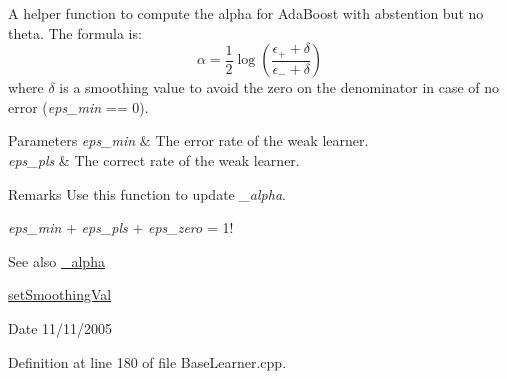 A helper function to compute the alpha for AdaBoost with abstention but no theta. The formula is: \[ \alpha = \frac{1}{2} \log \left( \frac{\epsilon_+ + \delta}{\epsilon_- + \delta} \right) \] where $\delta$ is a smoothing value to avoid the zero on the denominator in case of no error ({\itshape eps\_\-min\/} == 0). 
\begin{DoxyParams}{Parameters}
{\em eps\_\-min} & The error rate of the weak learner. \\
\hline
{\em eps\_\-pls} & The correct rate of the weak learner. \\
\hline
\end{DoxyParams}
\begin{DoxyRemark}{Remarks}
Use this function to update {\itshape \_\-alpha\/}. 

{\itshape eps\_\-min\/} + {\itshape eps\_\-pls\/} + {\itshape eps\_\-zero\/} = 1! 
\end{DoxyRemark}
\begin{DoxySeeAlso}{See also}
\hyperlink{classMultiBoost_1_1BaseLearner_a042fb5ff66939dd2135d769308acc16e}{\_\-alpha} 

\hyperlink{classMultiBoost_1_1BaseLearner_a02657dfe35ffff80d2b2fb44e2d8731c}{setSmoothingVal} 
\end{DoxySeeAlso}
\begin{DoxyDate}{Date}
11/11/2005 
\end{DoxyDate}


Definition at line 180 of file BaseLearner.cpp.

